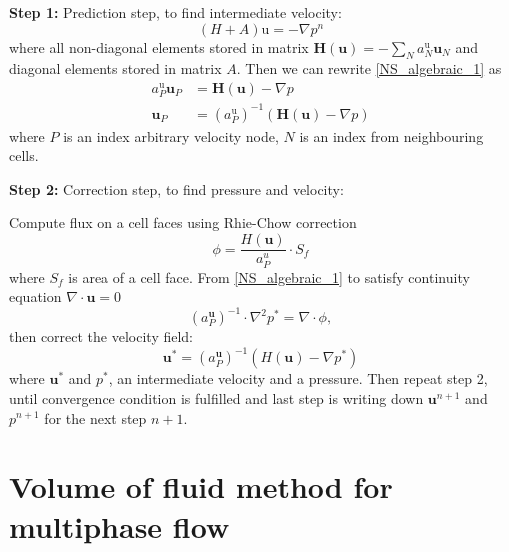 \textbf{Step 1:} Prediction step, to find intermediate velocity:
\begin{equation}\label{NS_algebraic_1}
    (H+A)\mathrm{u} = -\nabla p^n
\end{equation}
where all non-diagonal elements stored in matrix $\mathbf{H}(\mathbf{u})= -\sum_{N} a_{N}^{\mathrm{u}} \mathbf{u}_{N}$ and diagonal elements stored in matrix $A$. Then we can rewrite \ref{NS_algebraic_1} as
\begin{equation}\label{NS_algebraic_2_}
    \begin{aligned}
a_{P}^{\mathrm{u}} \mathbf{u}_{P} &= \mathbf{H}(\mathbf{u})-\nabla p \\
\mathbf{u}_{P} &= \left(a_{P}^{\mathrm{u}}\right)^{-1}(\mathbf{H}(\mathbf{u})-\nabla p)
\end{aligned}
\end{equation}
where $P$ is an index arbitrary velocity node, $N$ is an index from neighbouring cells.

\textbf{Step 2:} Correction step, to find pressure and velocity:

Compute flux on a cell faces using Rhie-Chow \cite{rhie} correction
\begin{equation}
    \phi = \frac{H(\mathbf{u})}{a^u_P}\cdot S_f
\end{equation}
where $S_f$ is area of a cell face. From \ref{NS_algebraic_1} to satisfy continuity equation $\nabla\cdot \mathbf{u} = 0$
\begin{equation}
    (a_{P}^{\mathbf{u}})^{-1} \cdot \nabla^2 p^* = \nabla \cdot \phi,
\end{equation}
then correct the velocity field:
\begin{equation}
    \mathbf{u}^{*} = (a_{P}^{\mathbf{u}})^{-1}(H(\mathbf{u}) - \nabla p^*)
\end{equation}
where $\mathbf{u}^*$ and $p^*$, an intermediate velocity and a pressure. Then repeat step 2, until convergence condition is fulfilled and last step is writing down $\mathbf{u}^{n+1}$ and $p^{n+1}$ for the next step $n + 1$.

\section{Volume of fluid method for multiphase flow}

